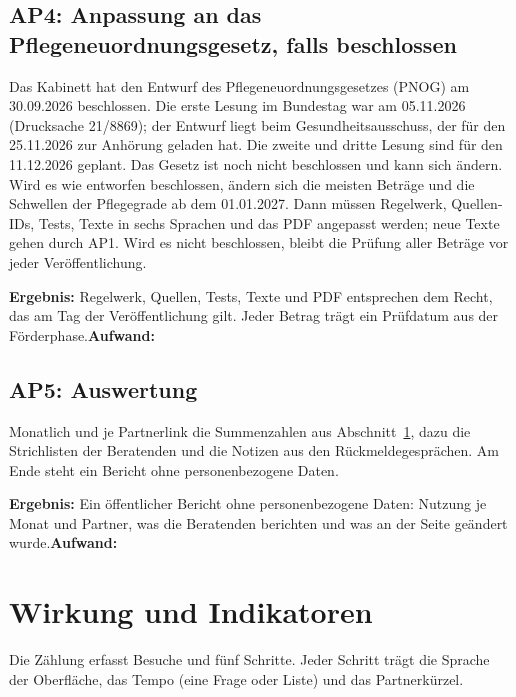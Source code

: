 \documentclass[11pt,a4paper,parskip=half-]{scrartcl}
\begin{document}
\subsection*{AP4: Anpassung an das Pflegeneuordnungsgesetz, falls beschlossen}
Das Kabinett hat den Entwurf des Pflegeneuordnungsgesetzes (PNOG) am 30.09.2026 beschlossen.
Die erste Lesung im Bundestag war am 05.11.2026 (Drucksache 21/8869); der Entwurf liegt beim
Gesundheitsausschuss, der für den 25.11.2026 zur Anhörung geladen hat. Die zweite und dritte Lesung
sind für den 11.12.2026 geplant.%
Das Gesetz ist noch nicht beschlossen
und kann sich ändern. Wird es wie entworfen beschlossen, ändern sich die meisten Beträge und die
Schwellen der Pflegegrade ab dem 01.01.2027. Dann müssen Regelwerk, Quellen-IDs, Tests, Texte in
sechs Sprachen und das PDF angepasst werden; neue Texte gehen durch AP1.
Wird es nicht beschlossen, bleibt die Prüfung aller Beträge vor jeder Veröffentlichung.
\par\textbf{Ergebnis:} Regelwerk, Quellen, Tests, Texte und PDF entsprechen dem Recht, das am Tag der Veröffentlichung gilt. Jeder Betrag trägt ein Prüfdatum aus der Förderphase.\quad \textbf{Aufwand:} 

\subsection*{AP5: Auswertung}
Monatlich und je Partnerlink die Summenzahlen aus Abschnitt~\ref{sec:wirkung},
dazu die Strichlisten der Beratenden und die Notizen aus den Rückmeldegesprächen.
Am Ende steht ein Bericht ohne personenbezogene Daten.
\par\textbf{Ergebnis:} Ein öffentlicher Bericht ohne personenbezogene Daten: Nutzung je Monat und Partner, was die Beratenden berichten und was an der Seite geändert wurde.\quad \textbf{Aufwand:} 

\section{Wirkung und Indikatoren}\label{sec:wirkung}
Die Zählung erfasst Besuche und fünf Schritte. Jeder Schritt trägt die Sprache der Oberfläche,
das Tempo (eine Frage oder Liste) und das Partnerkürzel.
\end{document}
